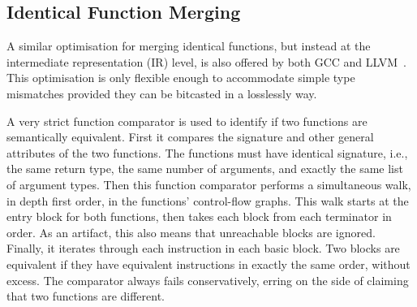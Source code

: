 
\subsection{Identical Function Merging}

A similar optimisation for merging identical functions, but instead at the
intermediate representation (IR) level, is also offered by both GCC and
LLVM~\cite{llvm-fm,livska14}.
This optimisation is only flexible enough to accommodate simple type mismatches
provided they can be bitcasted in a losslessly way.


A very strict function comparator is used to identify if two functions are 
semantically equivalent.
First it compares the signature and other general attributes of the two functions.
The functions must have identical signature, i.e., the same return type, the same
number of arguments, and exactly the same list of argument types.
Then this function comparator performs a simultaneous walk, in depth
first order, in the functions' control-flow graphs.
This walk starts at the entry block for both functions, then takes each block
from each terminator in order.
As an artifact, this also means that unreachable blocks are ignored.
Finally, it iterates through each instruction in each basic block.
Two blocks are equivalent if they have equivalent instructions in exactly the
same order, without excess.
The comparator always fails conservatively, erring on the side of claiming that
two functions are different.


